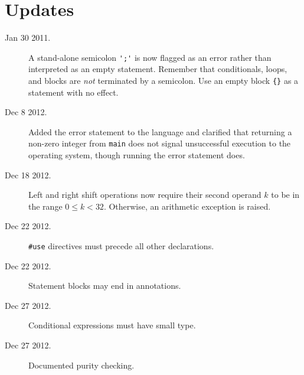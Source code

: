\documentclass[11pt]{article}
\begin{document}
\section{Updates}
\label{sec:updates}
\hypertarget{sec:updates}{}

\begin{description}
\item[Jan 30 2011.] A stand-alone semicolon \verb"';'" is
  now flagged as an error rather than interpreted as an empty
  statement.  Remember that conditionals, loops, and blocks are
  \emph{not} terminated by a semicolon.  Use an empty block \verb'{}'
  as a statement with no effect.
\item[Dec 8 2012.] Added the error statement to the language and
  clarified that returning a non-zero integer from \verb'main' does
  not signal unsuccessful execution to the operating system, though
  running the error statement does.
\item[Dec 18 2012.] Left and right shift operations now require their
  second operand $k$ to be in the range $0 \leq k < 32$.  Otherwise,
  an arithmetic exception is raised.
\item[Dec 22 2012.] \verb'#use' directives must precede all other
  declarations.
\item[Dec 22 2012.] Statement blocks may end in annotations.
\item[Dec 27 2012.] Conditional expressions must have small type.
\item[Dec 27 2012.] Documented purity checking.
\end{description}
\end{document}
